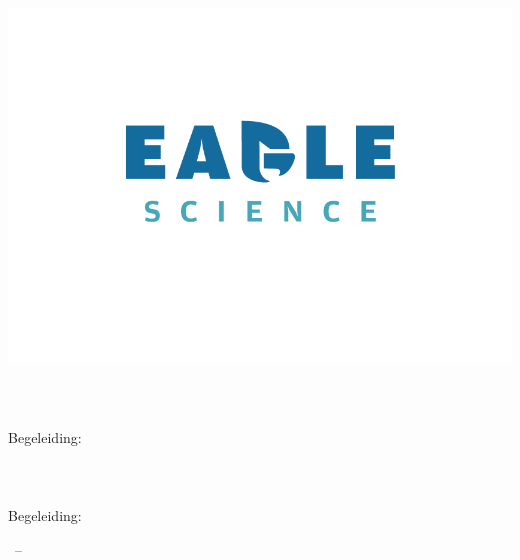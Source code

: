 
\begin{titlepage}

    \begin{addmargin}[-1cm]{-3cm}
        \begin{center}
            \large

            \hfill
            \vfill

            \begingroup
            \color[HTML]{27406B}\spacedallcaps{\myTitle} \\ \bigskip %

            \color[HTML]{84C6C8}\mySubtitle \\ \medskip
            \endgroup

            \spacedlowsmallcaps{\myName} %

            \vfill

            \includegraphics[width=15cm]{gfx/EagleScience_Logo_on_white} \\  %


            \myworkName \\
            \myworkAddress \\
            \myworkPostcodeCity \\
            Begeleiding: \myStagebegeleider \\
            \bigskip \bigskip \bigskip
            \myDepartment \\
            \myFaculty \\
            \myUni \\
            Begeleiding: \myHvABegeleider \\ \bigskip \bigskip \bigskip


            \myTime\ -- \myVersion %

            \vfill

        \end{center}
    \end{addmargin}

\end{titlepage}
